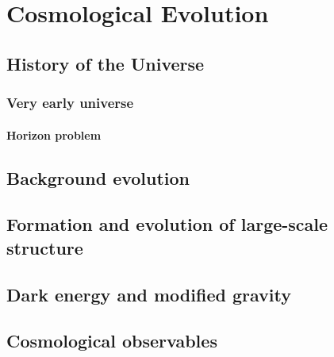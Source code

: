 \chapter{Cosmological Evolution}

\section{History of the Universe}

\subsection{Very early universe}

\subsubsection{Horizon problem}

\section{Background evolution}

\section{Formation and evolution of large-scale structure}

\section{Dark energy and modified gravity}

\section{Cosmological observables}